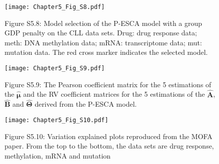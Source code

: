 \begin{figure}[htbp]
    \centering
    \texttt{[image: Chapter5\_Fig\_S8.pdf]}
    \caption*{Figure S5.8: Model selection of the P-ESCA model with a group GDP penalty on the CLL data sets. Drug: drug response data; meth: DNA methylation data; mRNA: transcriptome data; mut: mutation data. The red cross marker indicates the selected model.}
	\label{chapter5_fig:S8}
\end{figure}

\begin{figure}[htbp]
    \centering
    \texttt{[image: Chapter5\_Fig\_S9.pdf]}
    \caption*{Figure S5.9: The Pearson coefficient matrix for the 5 estimations of the $\hat{\bm{\mu}}$ and the RV coefficient matrices for the 5 estimations of the $\hat{\mathbf{A}}$, $\hat{\mathbf{B}}$ and $\hat{\mathbf{\Theta}}$ derived from the P-ESCA model.}
	\label{chapter5_fig:S9}
\end{figure}

\begin{figure}[htbp]
    \centering
    \texttt{[image: Chapter5\_Fig\_S10.pdf]}
    \caption*{Figure S5.10: Variation explained plots reproduced from the MOFA paper. From the top to the bottom, the data sets are drug response, methylation, mRNA and mutation}
	\label{chapter5_fig:S10}
\end{figure}

